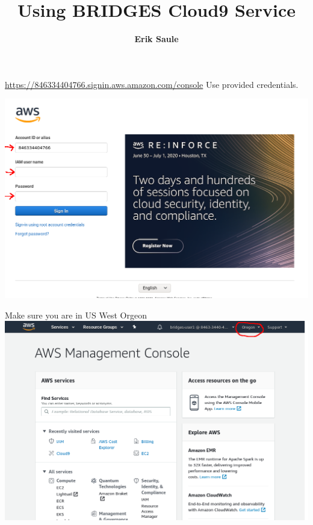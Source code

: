 \documentclass{beamer}
\title[Using Cloud9]{Using BRIDGES Cloud9 Service}
\author[Erik Saule]{{\bf Erik Saule}\\\email{esaule@uncc.edu}}
\institute[BRIDGES]{BRIDGES Workshop}
\date{}
\begin{document}
\maketitle

\begin{frame}{\url{https://846334404766.signin.aws.amazon.com/console}}
  Use provided credentials.
  
  \includegraphics[width=\linewidth]{cloud9_figures/AWSCloud9SignIn.png}

\end{frame}



\begin{frame}{Make sure you are in US West Orgeon}
  \includegraphics[width=\linewidth]{cloud9_figures/AWSRegion.png}
\end{frame}
\end{document}
